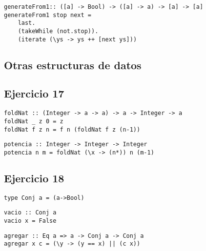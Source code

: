 \begin{centrado}
    \begin{verbatim}
generateFrom1:: ([a] -> Bool) -> ([a] -> a) -> [a] -> [a]
generateFrom1 stop next = 
    last.
    (takeWhile (not.stop)).
    (iterate (\ys -> ys ++ [next ys]))
    \end{verbatim}
\end{centrado}

\subsection*{Otras estructuras de datos}
\subsection{Ejercicio 17}
\begin{centrado}
    \begin{verbatim}
foldNat :: (Integer -> a -> a) -> a -> Integer -> a
foldNat _ z 0 = z
foldNat f z n = f n (foldNat f z (n-1))
\end{verbatim}
\end{centrado}

\begin{centrado}
    \begin{verbatim}
potencia :: Integer -> Integer -> Integer
potencia n m = foldNat (\x -> (n*)) n (m-1)
    \end{verbatim}
\end{centrado}

\subsection{Ejercicio 18}
\begin{centrado}
    \begin{verbatim}
type Conj a = (a->Bool)
    \end{verbatim}
\end{centrado}

\begin{centrado}
    \begin{verbatim}
vacio :: Conj a
vacio x = False
    \end{verbatim}
\end{centrado}

\begin{centrado}
    \begin{verbatim}
agregar :: Eq a => a -> Conj a -> Conj a
agregar x c = (\y -> (y == x) || (c x))
    \end{verbatim}
\end{centrado}

